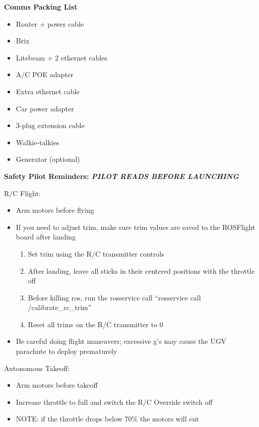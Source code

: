 \documentclass[]{auvsi_doc}
\begin{document}
\hrulefill

\textbf{Comms Packing List}
\begin{itemize}
\item Router + power cable
        \item Brix
	\item Litebeam + 2 ethernet cables
	\item A/C POE adapter
	\item Extra ethernet cable
	\item Car power adapter
	\item 3-plug extension cable
	\item Walkie-talkies
	\item Generator (optional)
\end{itemize}

\hrulefill

\textbf{Safety Pilot Reminders: \textit{PILOT READS BEFORE LAUNCHING}}

R/C Flight:

\begin{itemize}
	\item Arm motors before flying
	\item If you need to adjust trim, make sure trim values are saved to the ROSFlight board after landing
	\begin{enumerate}
		\item Set trim using the R/C transmitter controls
		\item After landing, leave all sticks in their centered positions with the throttle off
		\item Before killing ros, run the rosservice call ``rosservice call /calibrate\_rc\_trim''
		\item Reset all trims on the R/C transmitter to 0
	\end{enumerate}
	\item Be careful doing flight maneuvers; excessive g's may cause the UGV parachute to deploy prematurely
\end{itemize}

Autonomous Takeoff:

\begin{itemize}
	\item Arm motors before takeoff
	\item Increase throttle to full and switch the R/C Override switch off
	\item NOTE: if the throttle drops below 70\% the motors will cut
\end{itemize}
\end{document}
